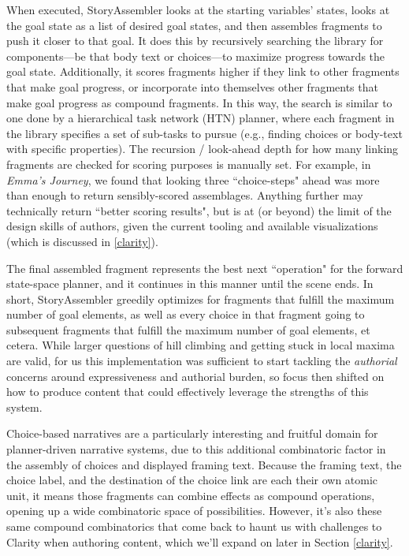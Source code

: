 When executed, StoryAssembler looks at the starting variables' states, looks at the goal state as a list of desired goal states, and then assembles fragments to push it closer to that goal. It does this by recursively searching the library for components---be that body text or choices---to maximize progress towards the goal state. Additionally, it scores fragments higher if they link to other fragments that make goal progress, or incorporate into themselves other fragments that make goal progress as compound fragments. In this way, the search is similar to one done by a hierarchical task network (HTN) planner, where each fragment in the library specifies a set of sub-tasks to pursue (e.g., finding choices or body-text with specific properties). The recursion / look-ahead depth for how many linking fragments are checked for scoring purposes is manually set. For example, in \textit{Emma's Journey}, we found that looking three ``choice-steps" ahead was more than enough to return sensibly-scored assemblages. Anything further may technically return ``better scoring results", but is at (or beyond) the limit of the design skills of authors, given the current tooling and available visualizations (which is discussed in \ref{clarity}).

The final assembled fragment represents the best next ``operation" for the forward state-space planner, and it continues in this manner until the scene ends. In short, StoryAssembler greedily optimizes for fragments that fulfill the maximum number of goal elements, as well as every choice in that fragment going to subsequent fragments that fulfill the maximum number of goal elements, et cetera. While larger questions of hill climbing and getting stuck in local maxima are valid, for us this implementation was sufficient to start tackling the \textit{authorial} concerns around expressiveness and authorial burden, so focus then shifted on how to produce content that could effectively leverage the strengths of this system.

Choice-based narratives are a particularly interesting and fruitful domain for planner-driven narrative systems, due to this additional combinatoric factor in the assembly of choices and displayed framing text. Because the framing text, the choice label, and the destination of the choice link are each their own atomic unit, it means those fragments can combine effects as compound operations, opening up a wide combinatoric space of possibilities. However, it's also these same compound combinatorics that come back to haunt us with challenges to Clarity when authoring content, which we'll expand on later in Section \ref{clarity}.

